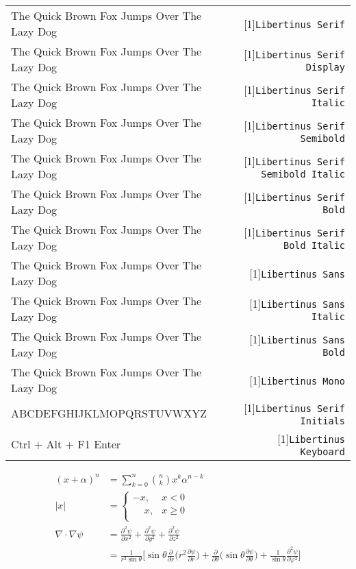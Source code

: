 \documentclass{minimal}
\def\sample#1#2{{\fontspec{#1} #2} & \scalebox{.6}[1]{\texttt{#1}}}
\def\panagram#1{\sample{#1}{The Quick Brown Fox Jumps Over The Lazy Dog}}
\begin{document}
\pagestyle{empty}

\begin{center}
  \begin{tabular}{l r}
   \panagram{Libertinus Serif} \\
   \panagram{Libertinus Serif Display} \\
   \panagram{Libertinus Serif Italic} \\
   \panagram{Libertinus Serif Semibold} \\
   \panagram{Libertinus Serif Semibold Italic} \\
   \panagram{Libertinus Serif Bold} \\
   \panagram{Libertinus Serif Bold Italic} \\
   \panagram{Libertinus Sans} \\
   \panagram{Libertinus Sans Italic} \\
   \panagram{Libertinus Sans Bold} \\
   \panagram{Libertinus Mono} \\
   \sample{Libertinus Serif Initials}{ABCDEFGHIJKLMOPQRSTUVWXYZ} \\
   \sample{Libertinus Keyboard}{Ctrl \textsf{+} Alt \textsf{+} F1 Enter} \\
  \end{tabular}
\end{center}

\begin{align*}
\left(x+α\right)^n	& =\sum_{k=0}^n \binom nk x^k α^{n-k}	\\
\left|x\right|		& =\begin{cases}
				-x,		& x<0	\\
				\phantom{-}x,	& x≥0	\\
			   \end{cases}				\\
	∇⋅∇ψ			& =\frac{∂^2ψ}{∂x^2}\mathbin{+}\frac{∂^2ψ}{∂y^2}+\frac{∂^2ψ}{∂z^2} \\
			& =\frac{1}{r^{2}\sin θ} \Bigg[\sin θ\frac{∂}{∂r}\bigg(r^{2}\frac{∂ψ}{∂r}\bigg)
			  +\frac{∂}{∂θ}\bigg(\sin θ\frac{∂ψ}{∂θ}\bigg)+\frac{1}{\sin θ}\frac{∂^{2}ψ}{∂φ^{2}}\Bigg]
\end{align*}
\end{document}
